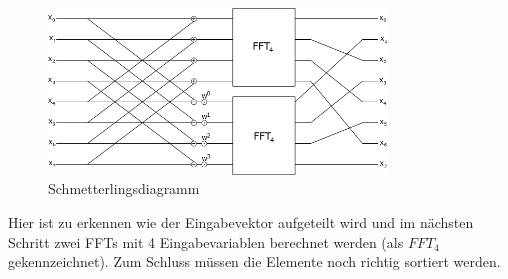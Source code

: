 \begin{figure}
\centering
 \includegraphics[width=0.8\textwidth]{Pictures/FFT.png}
\caption{Schmetterlingsdiagramm}
\label{fig:schmetterlingsdiagram}
\end{figure} 
Hier ist zu erkennen wie der Eingabevektor aufgeteilt wird und im nächsten Schritt zwei FFTs mit 4 Eingabevariablen berechnet werden (als $FFT_4$ gekennzeichnet).
Zum Schluss müssen die Elemente noch richtig sortiert werden. 

